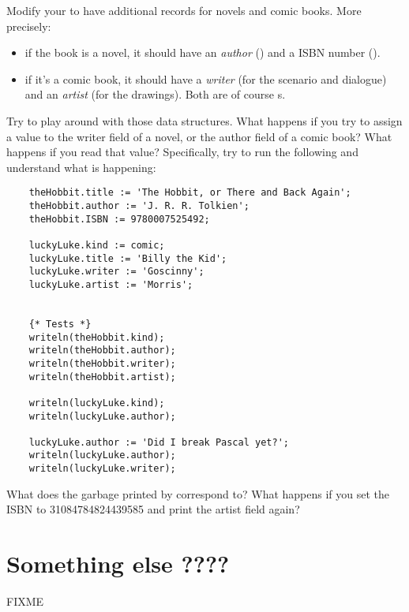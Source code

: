 \documentclass{../../tp}
\begin{document}
\begin{instruction}
Modify your  to have additional records for novels and comic books. More precisely:
	\begin{itemize}
		\item if the book is a novel, it should have an \emph{author} () and a ISBN number ().
		\item if it's a comic book, it should have a \emph{writer} (for the scenario and dialogue) and an \emph{artist} (for the drawings). Both are of course s.
	\end{itemize} 
	
	Try to play around with those data structures. What happens if you try to assign a value to the writer field of a novel, or the author field of a comic book? What happens if you read that value?
	Specifically, try to run the following and understand what is happening:
	
	\begin{verbatim}
	theHobbit.title := 'The Hobbit, or There and Back Again';
	theHobbit.author := 'J. R. R. Tolkien';
	theHobbit.ISBN := 9780007525492;

	luckyLuke.kind := comic;
	luckyLuke.title := 'Billy the Kid';
	luckyLuke.writer := 'Goscinny';
	luckyLuke.artist := 'Morris';


	{* Tests *}
	writeln(theHobbit.kind);
	writeln(theHobbit.author);
	writeln(theHobbit.writer);
	writeln(theHobbit.artist);

	writeln(luckyLuke.kind);        
	writeln(luckyLuke.author);

	luckyLuke.author := 'Did I break Pascal yet?';
	writeln(luckyLuke.author);
	writeln(luckyLuke.writer);

	\end{verbatim}

	What does the garbage printed by  correspond to?
	What happens if you set the ISBN to 31084784824439585 and print the artist field again? 
\end{instruction}


\section{Something else ????}

FIXME 
\end{document}
